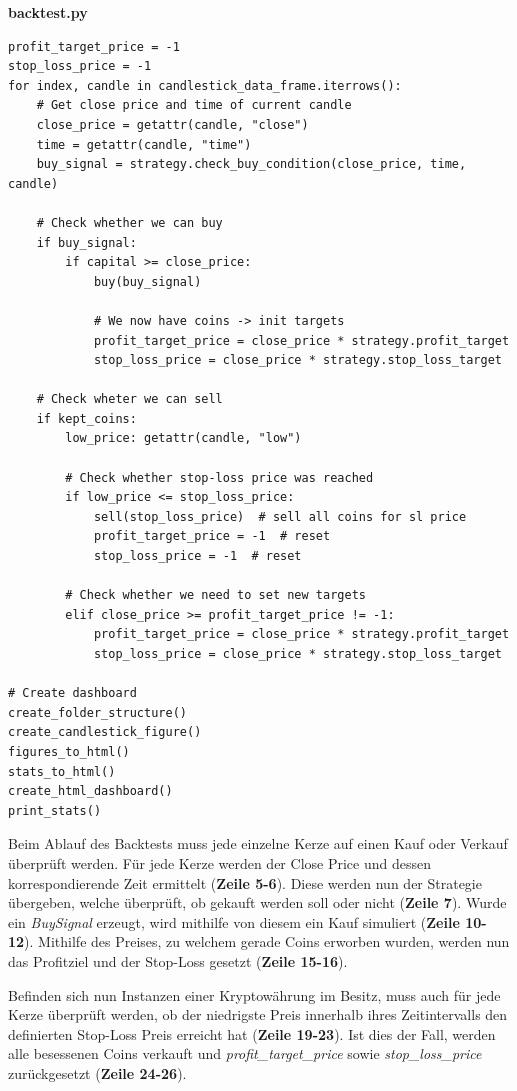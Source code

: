 \documentclass[oneside]{ausarbeitung}
\begin{document}
\lstset{language=Python}
\lstset{frame=lines}
\lstset{basicstyle=\footnotesize}
\textbf{backtest.py}
\begin{lstlisting}
profit_target_price = -1
stop_loss_price = -1
for index, candle in candlestick_data_frame.iterrows():
	# Get close price and time of current candle
	close_price = getattr(candle, "close")
	time = getattr(candle, "time")
	buy_signal = strategy.check_buy_condition(close_price, time, candle)
	
	# Check whether we can buy
	if buy_signal:
		if capital >= close_price:
			buy(buy_signal)
			
			# We now have coins -> init targets
			profit_target_price = close_price * strategy.profit_target
			stop_loss_price = close_price * strategy.stop_loss_target
			
	# Check wheter we can sell
	if kept_coins:
		low_price: getattr(candle, "low")
		
		# Check whether stop-loss price was reached
		if low_price <= stop_loss_price:
			sell(stop_loss_price)  # sell all coins for sl price
			profit_target_price = -1  # reset
			stop_loss_price = -1  # reset
			
		# Check whether we need to set new targets
		elif close_price >= profit_target_price != -1:
			profit_target_price = close_price * strategy.profit_target
			stop_loss_price = close_price * strategy.stop_loss_target

# Create dashboard		
create_folder_structure()
create_candlestick_figure()
figures_to_html()
stats_to_html()
create_html_dashboard()
print_stats()
\end{lstlisting}

Beim Ablauf des Backtests muss jede einzelne Kerze auf einen Kauf oder Verkauf überprüft werden. Für jede Kerze werden der Close Price und dessen korrespondierende Zeit ermittelt (\textbf{Zeile 5-6}). Diese werden nun der Strategie übergeben, welche überprüft, ob gekauft werden soll oder nicht (\textbf{Zeile 7}). Wurde ein \textit{BuySignal} erzeugt, wird mithilfe von diesem ein Kauf simuliert (\textbf{Zeile 10-12}). Mithilfe des Preises, zu welchem gerade Coins erworben wurden, werden nun das Profitziel und der Stop-Loss gesetzt (\textbf{Zeile 15-16}).

Befinden sich nun Instanzen einer Kryptowährung im Besitz, muss auch für jede Kerze überprüft werden, ob der niedrigste Preis innerhalb ihres Zeitintervalls den definierten Stop-Loss Preis erreicht hat (\textbf{Zeile 19-23}). Ist dies der Fall, werden alle besessenen Coins verkauft und \textit{profit\_target\_price} sowie \textit{stop\_loss\_price} zurückgesetzt (\textbf{Zeile 24-26}).
\end{document}
